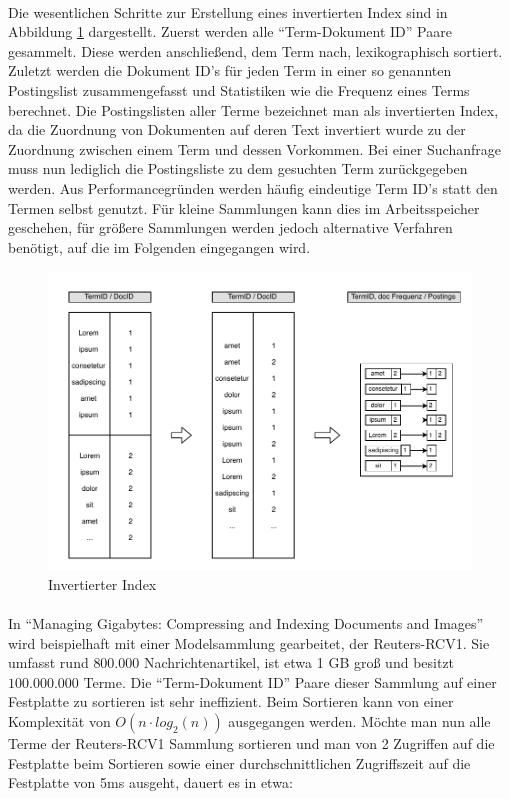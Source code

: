 \paragraph{}
Die wesentlichen Schritte zur Erstellung eines invertierten Index sind in Abbildung \ref{postingssList} dargestellt. Zuerst werden alle \enquote{Term-Dokument ID} Paare gesammelt. Diese werden anschließend, dem Term nach, lexikographisch sortiert. Zuletzt werden die Dokument ID's für jeden Term in einer so genannten Postingslist zusammengefasst und Statistiken wie die Frequenz eines Terms berechnet. Die Postingslisten aller Terme bezeichnet man als invertierten Index, da die Zuordnung von Dokumenten auf deren Text invertiert wurde zu der Zuordnung zwischen einem Term und dessen Vorkommen. Bei einer Suchanfrage muss nun lediglich die Postingsliste zu dem gesuchten Term zurückgegeben werden. Aus Performancegründen werden häufig eindeutige Term ID's statt den Termen selbst genutzt. Für kleine Sammlungen kann dies im Arbeitsspeicher geschehen, für größere Sammlungen werden jedoch alternative Verfahren benötigt, auf die im Folgenden eingegangen wird.
\par

\begin{figure}[ht]
  \includegraphics[width=\textwidth,height=0.4\textheight]{pdf/postingslist3.pdf}
  \caption{Invertierter Index}
  \label{postingssList}
\end{figure}

\paragraph{}
In \enquote{Managing Gigabytes: Compressing and Indexing Documents and Images}\cite{ir} wird beispielhaft mit einer Modelsammlung gearbeitet, der Reuters-RCV1. Sie umfasst rund $800.000$ Nachrichtenartikel, ist etwa 1 GB groß und besitzt $100.000.000$ Terme. Die \enquote{Term-Dokument ID} Paare dieser Sammlung auf einer Festplatte zu sortieren ist sehr ineffizient. Beim Sortieren kann von einer Komplexität von $O(n \cdot log_2 (n))$ ausgegangen werden. Möchte man nun alle Terme der Reuters-RCV1 Sammlung sortieren und man von 2 Zugriffen auf die Festplatte beim Sortieren sowie einer durchschnittlichen Zugriffszeit auf die Festplatte von 5ms ausgeht, dauert es in etwa:

